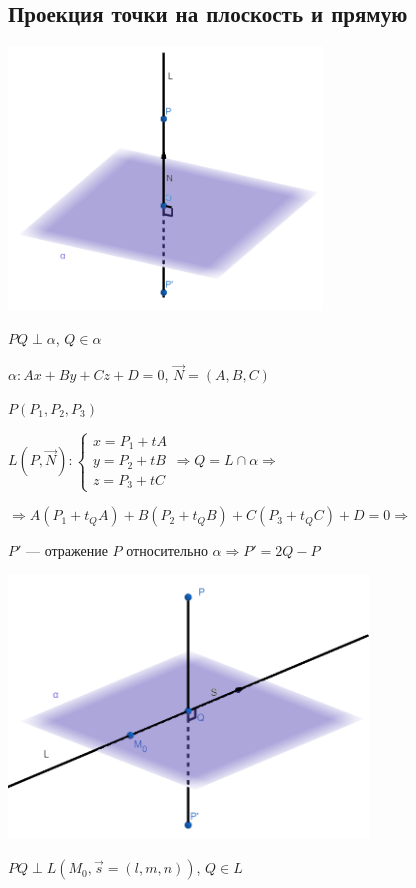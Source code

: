\documentclass[twoside]{book}
\begin{document}
\subsection{Проекция точки на плоскость и прямую}
\begin{center}
    \includegraphics[height=7cm]{Images/Chapter_1/2-3-1.png}
\end{center}
\(PQ \perp \alpha\), \(Q \in \alpha\)

\(\alpha: Ax + By + Cz + D = 0\), \(\vec N = (A, B, C)\)

\(P(P_1, P_2, P_3)\)

\(L(P, \vec N):
\begin{cases}
    x = P_1 + t A \\
    y = P_2 + t B \\
    z = P_3 + t C
\end{cases} \Rightarrow Q = L \cap \alpha \Rightarrow\)

\(\Rightarrow A(P_1 + t_Q A) + B(P_2 + t_Q B) + C(P_3 + t_Q C) + D = 0 \Rightarrow\)

\(P'\) --- отражение \(P\) относительно \(\alpha \Rightarrow P' = 2Q - P\)
\begin{center}
    \includegraphics[height=7cm]{Images/Chapter_1/2-3-2.png}
\end{center}
\(PQ \perp L(M_0, \vec s = (l, m, n))\), \(Q \in L\)
\end{document}
